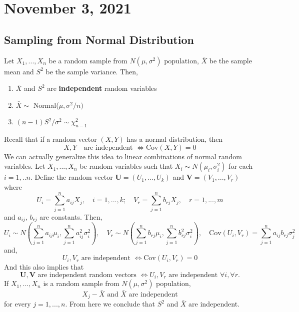 \section{November 3, 2021}
\subsection{Sampling from Normal Distribution}
\begin{proposition}
    Let $X_1,...,X_n$ be a random sample from $N(\mu,\sigma^2)$ population, $\bar{X}$ be the sample mean and $S^2$ be the sample variance. Then, 
    \begin{enumerate}
        \item $\bar{X}$ and $S^2$ are \textbf{independent} random variables
        \item $\bar{X} \sim$ Normal($\mu,\sigma^2/n)$
        \item $(n-1)S^2/\sigma^2 \sim \chi_{n-1}^2$
    \end{enumerate}
\end{proposition}
Recall that if a random vector $(X,Y)$ has a normal distribution, then
$$
X,Y \quad \text{are independent } \iff \text{Cov}(X,Y) = 0
$$
We can actually generalize this idea to linear combinations of normal random variables. Let $X_1,...,X_n$ be random variables such that $X_i \sim N(\mu_i, \sigma_i^2)$ for each $i=1,..n$. Define the random vector $\boldsymbol{U} =(U_1,...,U_k)$ and $\boldsymbol{V} = (V_1,...,V_r)$ where
$$
U_i = \sum_{j=1}^n a_{ij}X_j, \quad i=1,...,k; \quad V_r = \sum_{j=1}^{n}b_{rj}X_j, \quad r=1,...,m
$$
and $ a_{ij}$, $b_{rj}$ are constants. Then,
$$
U_i \sim N \left( \sum_{j=1}^n a_{ij} \mu_i, \sum_{j=1}^n a_{ij}^2 \sigma_i^2 \right),
\quad
V_r \sim N \left( \sum_{j=1}^n b_{rj} \mu_i, \sum_{j=1}^n b_{rj}^2 \sigma_i^2 \right),
\quad
\text{Cov}(U_i,V_r) = \sum_{j=1}^n a_{ij} b_{rj} \sigma_j^2
$$
and, 
$$
U_i,V_r \text{ are independent } \iff \text{Cov}(U_i,V_r) = 0
$$
And this also implies that
$$
\boldsymbol{U},\boldsymbol{V} \text{ are independent random vectors } \iff U_i, V_r \text{ are independent } \forall i, \forall r.
$$
 If $X_1,...,X_n$ is a random sample from $N(\mu, \sigma^2)$ population, 
$$
X_j - \bar{X} \text{ and } \bar{X} \text{ are independent}
$$
for every $j=1,...,n$. From here we conclude that $S^2$ and $\bar{X}$ are independent. 

